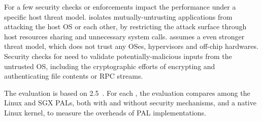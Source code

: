 For a few \hostapis{} %
security checks or enforcements
impact the performance
under a specific host threat model.
\graphene{}
isolates
mutually-untrusting applications from attacking the host OS or each other, %
by restricting the attack surface through host resources sharing and unnecessary system calls.
\graphenesgx{} assumes a even stronger threat model,
which does not trust any OSes, hypervisors and off-chip hardwares.
Security checks for \sgx{}
need to
validate potentially-malicious inputs
from the untrusted OS,
including the cryptographic efforts
of encrypting and authenticating file contents or RPC streams.


The evaluation is based on \lmbench{} 2.5~\cite{McVoy:lmbench}.
For each \hostapi{}, the evaluation %
compares among the Linux and SGX PALs,
both with and without %
security mechanisms,
and a native Linux kernel,
to measure the overheads of PAL implementations.




















